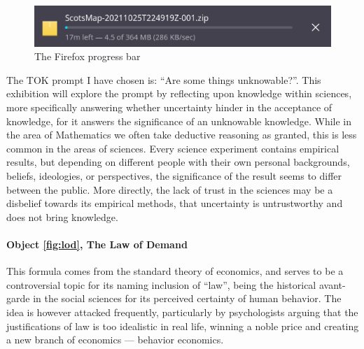 \documentclass[a4paper,12pt]{article}
\begin{document}
\begin{figure}[h!]
 \centering
 \includegraphics[scale=0.35]{progress.png}
 \caption{The Firefox progress bar}
 \label{fig:download}
\end{figure}



\newpage



The TOK prompt I have chosen is: ``Are some things unknowable?''. This exhibition will explore the prompt by reflecting upon knowledge within sciences, more specifically answering whether uncertainty hinder in the acceptance of knowledge, for it answers the significance of an unknowable knowledge. While in the area of Mathematics we often take deductive reasoning as granted, this is less common in the areas of sciences. Every science experiment contains empirical results, but depending on different people with their own personal backgrounds, beliefs, ideologies, or perspectives, the significance of the result seems to differ between the public. More directly, the lack of trust in the sciences may be a disbelief towards its empirical methods, that uncertainty is untrustworthy and does not bring knowledge.


\paragraph{Object \ref{fig:lod}, The Law of Demand}
This formula comes from the standard theory of economics, and serves to be a controversial topic for its naming inclusion of ``law'', being the historical avant-garde in the social sciences for its perceived certainty of human behavior. The idea is however attacked frequently, particularly by psychologists arguing that the justifications of law is too idealistic in real life, winning a noble price and creating a new branch of economics --- behavior economics.
\end{document}
